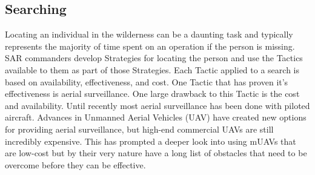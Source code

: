 \documentclass[12pt]{IEEEtran}
\begin{document}
\subsection{Searching}
Locating an individual in the wilderness can be a daunting task and typically
represents the majority of time spent on an operation if the person is missing.
SAR commanders develop Strategies for locating the person and use the Tactics
available to them as part of those Strategies.  Each Tactic applied to a search
is based on availability, effectiveness, and cost.  One Tactic that has proven
it's effectiveness is aerial surveillance.  One large drawback to this Tactic is
the cost and availability.  Until recently most aerial surveillance has been
done with piloted aircraft.  Advances in Unmanned Aerial Vehicles (UAV) have
created new options for providing aerial surveillance, but high-end
commercial UAVs are still incredibly expensive.  This has prompted a deeper
look into using mUAVs that are low-cost but by their very nature have a long
list of obstacles that need to be overcome before they can be effective.
\end{document}
